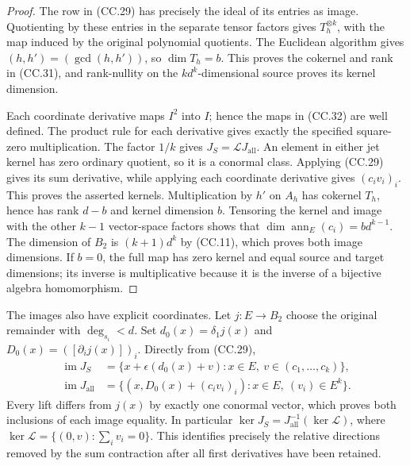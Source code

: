 \begin{proof}
The row in (CC.29) has precisely the ideal of its entries as image.
Quotienting by these entries in the separate tensor factors gives
\(T_h^{\otimes k}\), with the map induced by the original polynomial
quotients.  The Euclidean algorithm gives
\((h,h')=(\gcd(h,h'))\), so \(\dim T_h=b\).
This proves the cokernel and rank in (CC.31), and rank-nullity on
the \(kd^k\)-dimensional source proves its kernel dimension.

Each coordinate derivative maps \(I^2\) into \(I\); hence the
maps in (CC.32) are well defined.  The product rule for each
derivative gives exactly the specified square-zero multiplication.
The factor \(1/k\) gives \(J_S=\mathcal L J_{\mathrm{all}}\).
An element in either jet kernel has zero ordinary quotient,
so it is a conormal class.  Applying (CC.29) gives its sum
derivative, while applying each coordinate derivative gives
\((c_iv_i)_i\).  This proves the asserted kernels.
Multiplication by \(h'\) on \(A_h\) has cokernel \(T_h\), hence
has rank \(d-b\) and kernel dimension \(b\).  Tensoring the
kernel and image with the other \(k-1\) vector-space factors
shows that \(\dim\operatorname{ann}_E(c_i)=bd^{k-1}\).
The dimension of \(B_2\) is \((k+1)d^k\) by (CC.11), which
proves both image dimensions.  If \(b=0\), the full map has
zero kernel and equal source and target dimensions; its inverse
is multiplicative because it is the inverse of a bijective
algebra homomorphism.
\end{proof}

The images also have explicit coordinates.  Let
\(j:E\to B_2\) choose the original remainder with
\(\deg_{s_i}<d\).  Set
\(d_0(x)=\delta_1j(x)\) and
\(D_0(x)=([\partial_i j(x)])_i\).  Directly from (CC.29),
\[
 \begin{aligned}
 \operatorname{im}J_S
   &=\{x+\epsilon(d_0(x)+v):x\in E,
                       \ v\in(c_1,\ldots,c_k)\},\\
 \operatorname{im}J_{\mathrm{all}}
   &=\{(x,D_0(x)+(c_iv_i)_i):x\in E,
                                       \ (v_i)\in E^k\}.
 \end{aligned}\tag{CC.34}
\]
Every lift differs from \(j(x)\) by exactly one conormal vector,
which proves both inclusions of each image equality.  In particular
\(\ker J_S=J_{\mathrm{all}}^{-1}(\ker\mathcal L)\),
where \(\ker\mathcal L=\{(0,v):\sum_i v_i=0\}\).
This identifies precisely the relative directions removed by the
sum contraction after all first derivatives have been retained.

